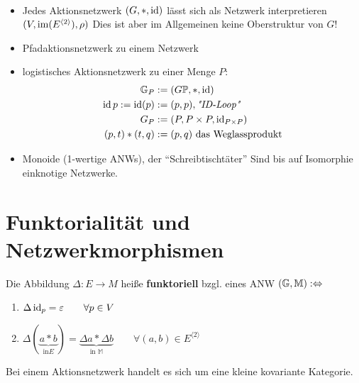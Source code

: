 \begin{beispiel}\
\begin{itemize}
\item Jedes Aktionsnetzwerk $(G, \ast, \operatorname{id})$ lässt sich als Netzwerk interpretieren \\$(V, \operatorname{im}(E^{\langle 2 \rangle}), \rho)$
Dies ist aber im Allgemeinen keine Oberstruktur von $G$!
\item Pfadaktionsnetzwerk zu einem Netzwerk
\item logistisches Aktionsnetzwerk zu einer Menge $P$:
\begin{align*}
    \mathbb{G}_P&:=(G\mathbb{P},\ast,\operatorname{id})\\
    \operatorname{id} p:=\operatorname{id}(p)&:=(p,p), \textit{"ID-Loop"}\\
    G_P&:=(P,P\times P,\operatorname{id}_{P\times P})\\
    (p,t)\ast(t,q)&:=(p,q)\text{ das Weglassprodukt}
\end{align*}
\item Monoide (1-wertige ANWs), der ``Schreibtischtäter''
Sind bis auf Isomorphie einknotige Netzwerke.
\end{itemize}
\end{beispiel}

\section{Funktorialität und Netzwerkmorphismen}
\begin{definition}
Die Abbildung $\Delta:E\to M$ heiße \textbf{funktoriell} bzgl. eines ANW $(\mathbb{G},\mathbb{M}):\Leftrightarrow$ 
\begin{enumerate}
\item $\Delta \operatorname{id}_p=\varepsilon\qquad\forall p\in V$
\item $\Delta (\underbrace{a\ast b}_{\text{in} E})=\underbrace{\Delta a\ast\Delta b}_{\text{in }\mathbb{M}}\qquad\forall(a,b)\in E^{\langle2\rangle}$
\end{enumerate}
\end{definition}

\begin{bemerkung}
Bei einem Aktionsnetzwerk handelt es sich um eine kleine kovariante Kategorie.
\end{bemerkung}

